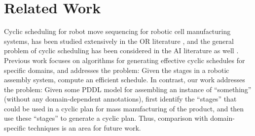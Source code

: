 \begin{table}
{

}
\caption{
{\small 
All \sss (a)  obtained from $\movements$,
(b) filtered by the start state feasibility,
(c) pruned by the filtering heuristics,
(d) filtered by mutex focused planning,
(e) remained after (b,c,d).
It is not shown here but $M$ for 3c is 40 and (a) is about $5\ten{11}$.
}}
\label{msss}
\end{table}


\section{Related Work}
\label{sec-4}

Cyclic scheduling for robot move sequencing for robotic cell
manufacturing systems, has been studied extensively in the OR
literature \cite{dawande2005sequencing}, and the general problem of
cyclic scheduling has been considered in the AI literature as well
\cite{DraperJCJ1999}.  Previous work focuses on algorithms for
generating effective cyclic schedules for specific domains, and
addresses the problem: Given the stages in a robotic
assembly system, compute an efficient schedule. In contrast, our work
addresses the problem: Given some PDDL model for assembling an instance of 
``something'' (without any domain-dependent annotations), first identify the
``stages'' that could be used in a cyclic plan for mass manufacturing
of the product, and then use these ``stages'' to generate a cyclic
plan. Thus, comparison with domain-specific techniques is an area for future work.




